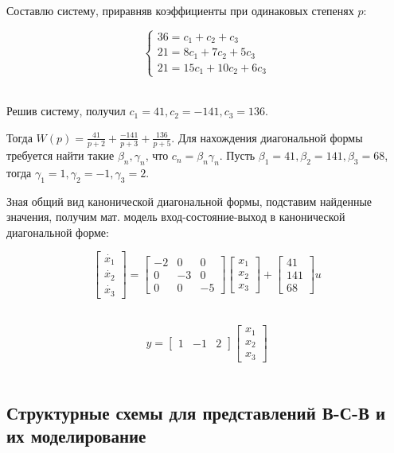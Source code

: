 \documentclass[a4paper]{article}
\begin{document}
Составлю систему, приравняв коэффициенты при одинаковых степенях $p$:

$$
\begin{cases}
36 = c_1 + c_2 + c_3 \\
21 = 8c_1 + 7c_2 + 5c_3 \\ 
21 = 15c_1 + 10c_2 + 6c_3
\end{cases}
$$\ 

Решив систему, получил $c_1 = 41, c_2 = -141, c_3 = 136$.\ 

Тогда $W(p) = \frac{41}{p+2}+\frac{-141}{p+3}+\frac{136}{p+5}$. Для нахождения диагональной формы требуется найти такие $\beta_n, \gamma_n$, что $c_n = \beta_n \gamma_n$. Пусть $\beta_1 = 41, \beta_2 = 141, \beta_3 = 68$, тогда $\gamma_1 = 1, \gamma_2 = -1, \gamma_3 = 2$.

Зная общий вид канонической диагональной формы, подставим найденные значения, получим мат. модель вход-состояние-выход в канонической диагональной форме:

$$
\begin{bmatrix}
    \dot{x_1} \\
    \dot{x_2} \\
    \dot{x_3}
\end{bmatrix} = \begin{bmatrix}
    -2 & 0 & 0 \\ 
    0 & -3 & 0 \\
    0 & 0 & -5
\end{bmatrix}\begin{bmatrix}
    x_1 \\
    x_2 \\
    x_3
\end{bmatrix} + \begin{bmatrix}
    41 \\ 
    141 \\ 
    68
\end{bmatrix}u
$$\

$$
y = \begin{bmatrix}
    1 & -1 & 2
\end{bmatrix}\begin{bmatrix}
    x_1 \\
    x_2 \\
    x_3
\end{bmatrix}
$$\

\subsection{Структурные схемы для представлений В-С-В и их моделирование}\
\end{document}
